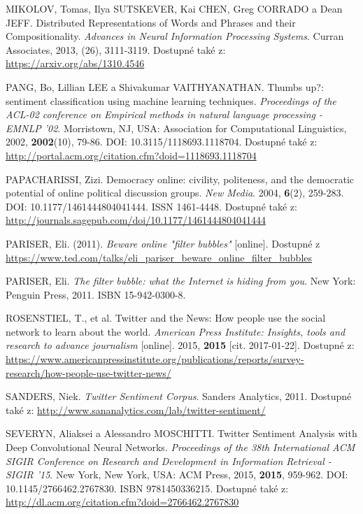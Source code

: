 \documentclass[12pt, a4paper]{article}
\numberwithin{equation}{section} 	%
\begin{document}
\begin{thebibliography}{99}
    MIKOLOV, Tomas, Ilya SUTSKEVER, Kai CHEN, Greg CORRADO a Dean JEFF. Distributed Representations of Words and Phrases and their Compositionality. \textit{Advances in Neural Information Processing Systems}. Curran Associates, 2013, (26), 3111-3119. Dostupné také z: \url{https://arxiv.org/abs/1310.4546}

    PANG, Bo, Lillian LEE a Shivakumar VAITHYANATHAN. Thumbs up?: sentiment classification using machine learning techniques. \textit{Proceedings of the ACL-02 conference on Empirical methods in natural language processing - EMNLP '02}. Morristown, NJ, USA: Association for Computational Linguistics, 2002, \textbf{2002}(10), 79-86. DOI: 10.3115/1118693.1118704. Dostupné také z: \url{http://portal.acm.org/citation.cfm?doid=1118693.1118704}

    PAPACHARISSI, Zizi. Democracy online: civility, politeness, and the democratic potential of online political discussion groups. \textit{New Media}. 2004, \textbf{6}(2), 259-283. DOI: 10.1177/1461444804041444. ISSN 1461-4448. Dostupné také z: \url{http://journals.sagepub.com/doi/10.1177/1461444804041444}

    PARISER, Eli. (2011). \textit{Beware online "filter bubbles"} [online]. Dostupné z \url{https://www.ted.com/talks/eli_pariser_beware_online_filter_bubbles}

    PARISER, Eli. \textit{The filter bubble: what the Internet is hiding from you}. New York: Penguin Press, 2011. ISBN 15-942-0300-8.

    ROSENSTIEL, T., et al. Twitter and the News: How people use the social network to learn about the world. \textit{American Press Institute: Insights, tools and research to advance journalism} [online]. 2015, \textbf{2015} [cit. 2017-01-22]. Dostupné z: \url{https://www.americanpressinstitute.org/publications/reports/survey-research/how-people-use-twitter-news/}

    SANDERS, Niek. \textit{Twitter Sentiment Corpus}. Sanders Analytics, 2011. Dostupné také z: \url{http://www.sananalytics.com/lab/twitter-sentiment/}

    SEVERYN, Aliaksei a Alessandro MOSCHITTI. Twitter Sentiment Analysis with Deep Convolutional Neural Networks. \textit{Proceedings of the 38th International ACM SIGIR Conference on Research and Development in Information Retrieval - SIGIR '15}. New York, New York, USA: ACM Press, 2015, \textbf{2015}, 959-962. DOI: 10.1145/2766462.2767830. ISBN 9781450336215. Dostupné také z: \url{http://dl.acm.org/citation.cfm?doid=2766462.2767830}


\end{thebibliography}
\end{document}
